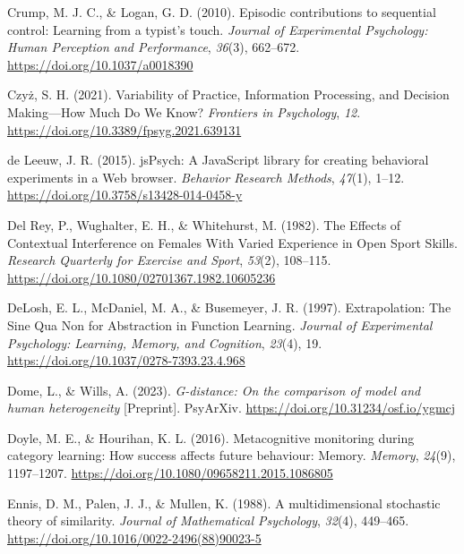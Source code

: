 \documentclass[
  11pt,
  letterpaper,
]{article}
\newlength{\cslhangindent}
\newenvironment{CSLReferences}[2] %
 {\begin{list}{}{%
  \setlength{\itemindent}{0pt}
  \setlength{\leftmargin}{0pt}
  \setlength{\parsep}{0pt}
  \ifodd #1
   \setlength{\leftmargin}{\cslhangindent}
   \setlength{\itemindent}{-1\cslhangindent}
  \fi
  \setlength{\itemsep}{#2\baselineskip}}}
 {\end{list}}
\begin{document}
\begin{CSLReferences}{1}{0}
Crump, M. J. C., \& Logan, G. D. (2010). Episodic contributions to
sequential control: {Learning} from a typist's touch. \emph{Journal of
Experimental Psychology: Human Perception and Performance},
\emph{36}(3), 662--672. \url{https://doi.org/10.1037/a0018390}

Czyż, S. H. (2021). Variability of {Practice}, {Information Processing},
and {Decision Making}---{How Much Do We Know}? \emph{Frontiers in
Psychology}, \emph{12}. \url{https://doi.org/10.3389/fpsyg.2021.639131}

de Leeuw, J. R. (2015). {jsPsych}: {A JavaScript} library for creating
behavioral experiments in a {Web} browser. \emph{Behavior Research
Methods}, \emph{47}(1), 1--12.
\url{https://doi.org/10.3758/s13428-014-0458-y}

Del Rey, P., Wughalter, E. H., \& Whitehurst, M. (1982). The {Effects}
of {Contextual Interference} on {Females With Varied Experience} in
{Open Sport Skills}. \emph{Research Quarterly for Exercise and Sport},
\emph{53}(2), 108--115.
\url{https://doi.org/10.1080/02701367.1982.10605236}

DeLosh, E. L., McDaniel, M. A., \& Busemeyer, J. R. (1997).
Extrapolation: {The Sine Qua Non} for {Abstraction} in {Function
Learning}. \emph{Journal of Experimental Psychology: Learning, Memory,
and Cognition}, \emph{23}(4), 19.
\url{https://doi.org/10.1037/0278-7393.23.4.968}

Dome, L., \& Wills, A. (2023). \emph{G-distance: {On} the comparison of
model and human heterogeneity} {[}Preprint{]}. PsyArXiv.
\url{https://doi.org/10.31234/osf.io/ygmcj}

Doyle, M. E., \& Hourihan, K. L. (2016). Metacognitive monitoring during
category learning: How success affects future behaviour: {Memory}.
\emph{Memory}, \emph{24}(9), 1197--1207.
\url{https://doi.org/10.1080/09658211.2015.1086805}

Ennis, D. M., Palen, J. J., \& Mullen, K. (1988). A multidimensional
stochastic theory of similarity. \emph{Journal of Mathematical
Psychology}, \emph{32}(4), 449--465.
\url{https://doi.org/10.1016/0022-2496(88)90023-5}


\end{CSLReferences}
\end{document}
